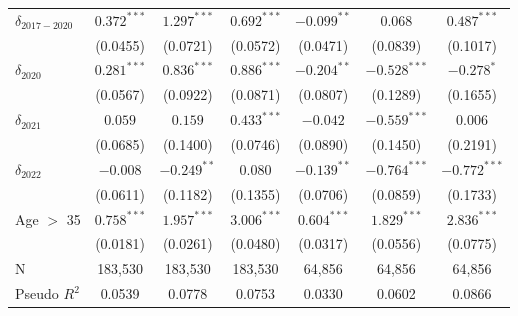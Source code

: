 \begin{tabular}{l|ccc|ccc}
$\delta_{2017-2020}$          &   $0.372^{***}$ &   $1.297^{***}$ &   $0.692^{***}$ &          $-0.099^{**}$ &         $0.068$ &   $0.487^{***}$ \\
                              &        (0.0455) &        (0.0721) &        (0.0572) &               (0.0471) &        (0.0839) &        (0.1017) \\
$\delta_{2020}$               &   $0.281^{***}$ &   $0.836^{***}$ &   $0.886^{***}$ &          $-0.204^{**}$ &  $-0.528^{***}$ &      $-0.278^*$ \\
                              &        (0.0567) &        (0.0922) &        (0.0871) &               (0.0807) &        (0.1289) &        (0.1655) \\
$\delta_{2021}$               &         $0.059$ &         $0.159$ &   $0.433^{***}$ &               $-0.042$ &  $-0.559^{***}$ &         $0.006$ \\
                              &        (0.0685) &        (0.1400) &        (0.0746) &               (0.0890) &        (0.1450) &        (0.2191) \\
$\delta_{2022}$               &        $-0.008$ &   $-0.249^{**}$ &         $0.080$ &          $-0.139^{**}$ &  $-0.764^{***}$ &  $-0.772^{***}$ \\
                              &        (0.0611) &        (0.1182) &        (0.1355) &               (0.0706) &        (0.0859) &        (0.1733) \\
Age $>$ 35                    &   $0.758^{***}$ &   $1.957^{***}$ &   $3.006^{***}$ &          $0.604^{***}$ &   $1.829^{***}$ &   $2.836^{***}$ \\
                              &        (0.0181) &        (0.0261) &        (0.0480) &               (0.0317) &        (0.0556) &        (0.0775) \\
N                             &         183,530 &         183,530 &         183,530 &                 64,856 &          64,856 &          64,856 \\
Pseudo $R^2$                  &          0.0539 &          0.0778 &          0.0753 &                 0.0330 &          0.0602 &          0.0866 \\
\bottomrule
\end{tabular}
